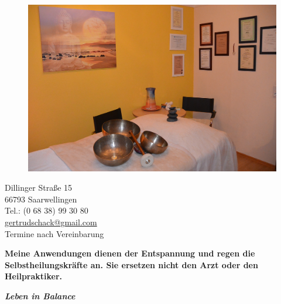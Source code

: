 \documentclass[10pt,foldmark,notumble]{leaflet}
\begin{document}
\vspace*{25mm}
\begin{figure}[h]
\includegraphics [scale=.13]{Raum_neu2.jpg}
\end{figure}


\vspace*{7mm}
\begin{flushleft}
Dillinger Straße 15\\
66793 Saarwellingen\\
Tel.: (0 68 38) 99 30 80\\
\href{mailto:gertrudschack@gmail.com}{gertrudschack@gmail.com} \\
\vspace{2mm}
\large{Termine nach Vereinbarung} %
\end{flushleft}

{\bf Meine Anwendungen dienen der Entspannung und \mbox{regen} die Selbstheilungskräfte an. Sie ersetzen nicht den Arzt oder den Heilpraktiker. }


\newpage
\vspace*{15mm}

\centerline {\Huge {\bf \it {Leben in Balance}}}
\end{document}
